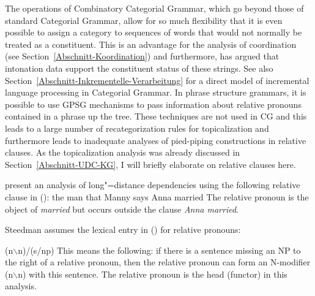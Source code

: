 The operations of Combinatory Categorial Grammar, which go beyond those of standard Categorial Grammar, allow for so much flexibility that it is even possible
to assign a category to sequences of words that would not normally be treated as a constituent. This is an advantage for the analysis of coordination
(see Section~\ref{Abschnitt-Koordination}) and furthermore, \citet{Steedman91a} has argued that intonation data support the constituent status of these strings.
See also Section~\ref{Abschnitt-Inkrementelle-Verarbeitung} for a direct model of incremental language processing in Categorial Grammar. In phrase structure grammars,
it is possible to use GPSG mechanisms to pass information about relative pronouns contained in a phrase up the tree. These techniques are not used in CG and this leads
to a large number of recategorization rules for topicalization and furthermore leads to inadequate analyses of pied-piping constructions in relative clauses. As the
topicalization analysis was already discussed in Section~\ref{Abschnitt-UDC-KG}, I will briefly elaborate on relative clauses here.

\citet[]{SB2006a-u} present an analysis of long"=distance dependencies using the following relative clause in ():
\ea
the man  that Manny says Anna married
\z
The relative pronoun is the object of \emph{married} but occurs outside the clause \emph{Anna married}.

Steedman assumes the lexical entry in () for relative pronouns:

\ea
\label{le-Relativpronomen-CG}
(n$\backslash$n)/(s/np)
\z
This means the following: if there is a sentence missing an NP to the right of a relative pronoun, then the relative pronoun can form an
N-modifier (n$\backslash$n) with this sentence. The relative pronoun is the head (functor) in this analysis.

